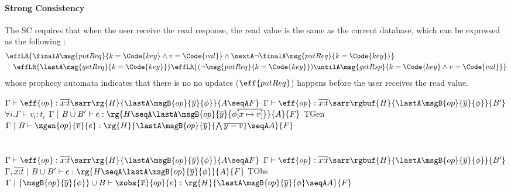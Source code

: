 \paragraph{Strong Consistency} The SC requires that when the user receive the read response, the read value is the same as the current database, which can be expressed as the following \PAT:
{\footnotesize
  \begin{align*}
    &\effLR{\finalA \msg{putReq}{k = \Code{key} \land v = \Code{val}} \land \nextA \neg \finalA \msg{putReq}{k = \Code{key}} } %
    \\& \quad \effLR{\lastA \msg{getReq}{k = \Code{key}}}%
    \effLR{(\neg \msg{putReq}{k = \Code{key}}) \untilA \msg{getRsp}{k = \Code{key} \land v = \Code{val}}}
\end{align*}}\noindent
whose prophecy automata indicates that there is no no updates ($\eff{putReq}$) happens before the user receives the read value.

{\footnotesize
\mprooftr{70mm}
{
$\Gamma \vdash \eff{op} : \overline{x{:}t}\sarr \rg{H}{\lastA\msgB{op}{\overline{y}}{\phi}}{A \seqA F}$ \quad
$\Gamma \vdash \eff{op} : \overline{x{:}t}\sarr \rgbuf{H}{\lastA\msgB{op}{\overline{y}}{\phi}}{B'}$ \quad
$\forall i. \Gamma \vdash v_i : t_i$ \quad
 $\Gamma ~|~ B \cup B' \vdash e : \rg{H \seqA \lastA\msgB{op}{\overline{y}}{\phi\overline{[x \mapsto v]}}}{A}{F}$
 }
{TGen}
{$\Gamma ~|~ B \vdash \zgen{op}{\overline{v}}{e} : \rg{H}{\lastA\msgB{op}{\overline{y}}{\bigwedge \overline{y = v}} \seqA A}{F}$}
\ \\ \ \\ \ \\
\mprooftr{80mm}
{
$\Gamma \vdash \eff{op} : \overline{x{:}t}\sarr \rg{H}{\lastA\msgB{op}{\overline{y}}{\phi}}{A \seqA F}$
\quad
$\Gamma \vdash \eff{op} : \overline{x{:}t}\sarr \rgbuf{H}{\lastA\msgB{op}{\overline{y}}{\phi}}{B'}$
\quad
 $\Gamma, \overline{x{:}t} ~|~ B \cup B' \vdash e : \rg{H \seqA \lastA\msgB{op}{\overline{y}}{\phi}}{A}{F}$
 }
{TObs}
{$\Gamma ~|~ \{\msgB{op}{\overline{y}}{\phi}\} \cup B \vdash \zobs{\overline{x}}{op}{e} : \rg{H}{\lastA\msgB{op}{\overline{y}}{\phi} \seqA A}{F}$}
}